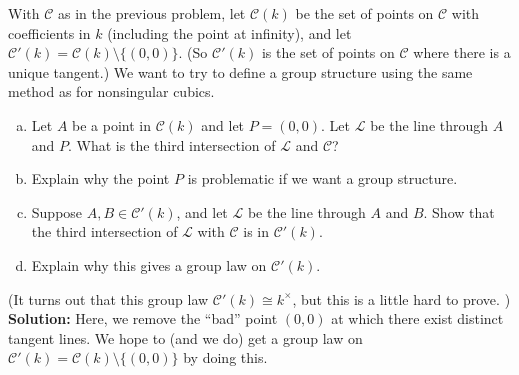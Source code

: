 \documentclass[12pt]{article}
\begin{document}
With $\mathcal{C}$ as in the previous problem, let $\mathcal{C}(k)$ be the set of points on $\mathcal{C}$ with coefficients in $k$ (including the point at infinity), and let $\mathcal{C}'(k) = \mathcal{C}(k)\setminus \{(0,0)\}$. (So $\mathcal{C}'(k)$ is the set of points on $\mathcal{C}$ where there is a unique tangent.) We want to try to define a group structure using the same method as for nonsingular cubics. 
\begin{enumerate}[(a)]
	\item Let $A$ be a point in $\mathcal{C}(k)$ and let $P = (0,0)$. Let $\mathcal{L}$ be the line through $A$ and $P$. What is the third intersection of $\mathcal{L}$ and $\mathcal{C}$?
	\item Explain why the point $P$ is problematic if we want a group structure.
	\item Suppose $A,B \in \mathcal{C}'(k)$, and let $\mathcal{L}$ be the line through $A$ and $B$. Show that the third intersection of $\mathcal{L}$ with $\mathcal{C}$ is in $\mathcal{C}'(k)$. 
	\item Explain why this gives a group law on $\mathcal{C}'(k)$. 
\end{enumerate}

\noindent (It turns out that this group law $\mathcal{C}'(k) \cong k^\times$, but this is a little hard to prove. )\\



\noindent \textbf{Solution:} Here, we remove the ``bad'' point $(0,0)$ at which there exist distinct tangent lines. We hope to (and we do) get a group law on $\mathcal{C}'(k) = \mathcal{C}(k) \setminus \{(0,0)\}$ by doing this.
\end{document}
